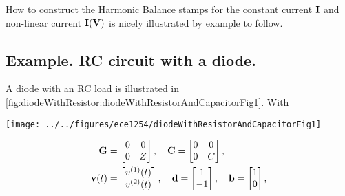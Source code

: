 \documentclass[12pt,journal,compsoc]{../ieeepaper/IEEEtran}
\begin{document}
How to construct the Harmonic Balance stamps for the constant current \( \mathbf{I} \) and non-linear current \( \mathbf{I}(\mathbf{V}) \) is nicely illustrated by example to follow.

\subsection{Example.  RC circuit with a diode.}

A diode with an RC load is illustrated in \cref{fig:diodeWithResistor:diodeWithResistorAndCapacitorFig1}.  With

\begin{figure*}[!t]
\begin{center}%
\texttt{[image: ../../figures/ece1254/diodeWithResistorAndCapacitorFig1]}
\caption{Simple non-linear circuit}
\label{fig:diodeWithResistor:diodeWithResistorAndCapacitorFig1}
\end{center}%
\end{figure*}

%

\begin{equation}\label{eqn:ece1254projectReport:640}
\begin{aligned}
\BG &=
\begin{bmatrix}
0 & 0 \\
0 & Z \\
\end{bmatrix}, \quad
\BC =
\begin{bmatrix}
0 & 0 \\
0 & C \\
\end{bmatrix}, \\
\Bv(t) &=
\begin{bmatrix}
v^{(1)}(t) \\
v^{(2)}(t) \\
\end{bmatrix}, \quad
\Bd = 
\begin{bmatrix}
1 \\
-1
\end{bmatrix}, \quad
\Bb = 
\begin{bmatrix}
1 \\
0
\end{bmatrix},
\end{aligned}
\end{equation}
\end{document}
